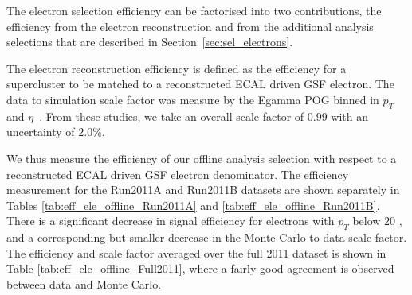
The electron selection efficiency can be factorised into two contributions,
the efficiency from the electron reconstruction and from the additional
analysis selections that are described in Section~\ref{sec:sel_electrons}.

The electron reconstruction efficiency is defined as the efficiency for a
supercluster to be matched to a reconstructed ECAL driven GSF electron.
The data to simulation scale factor was measure by the Egamma POG binned in
$p_T$ and $\eta$~\cite{ref:egamma_eff_gsf}. From these studies, we take an overall scale factor of
$0.99$ with an uncertainty of $2.0\%$.

We thus measure the efficiency of our offline analysis selection 
with respect to a reconstructed ECAL driven GSF electron denominator. 
The efficiency measurement for the Run2011A and Run2011B datasets are shown
separately in Tables \ref{tab:eff_ele_offline_Run2011A} and \ref{tab:eff_ele_offline_Run2011B}. 
There is a significant decrease in signal efficiency for electrons with 
$p_{T}$ below $20$ \GeV, and a corresponding but smaller decrease in the 
Monte Carlo to data scale factor. The efficiency and scale factor
averaged over the full 2011 dataset is shown in Table \ref{tab:eff_ele_offline_Full2011}, where
a fairly good agreement is observed between data and Monte Carlo.


